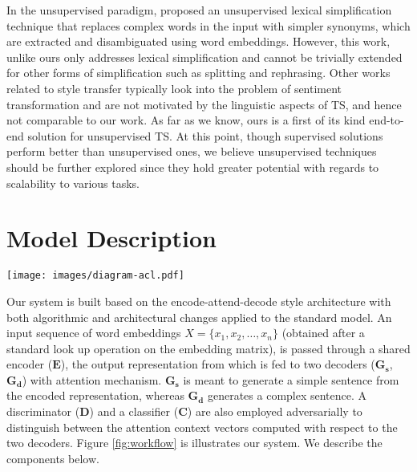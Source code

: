 \documentclass[11pt,a4paper]{article}
\begin{document}
In the unsupervised paradigm,  proposed an unsupervised lexical simplification technique that replaces complex words in the input with simpler synonyms, which are extracted and disambiguated using word embeddings. However, this work, unlike ours only addresses lexical simplification and cannot be trivially extended for other forms of simplification such as splitting and rephrasing. Other works related to style transfer \cite{zhang2018style,shen2017style,xu2018unpaired} typically look into the problem of sentiment transformation and are not motivated by the linguistic aspects of TS, and hence not comparable to our work. As far as we know, ours is a first of its kind end-to-end solution for unsupervised TS. At this point, though supervised solutions perform better than unsupervised ones, we believe unsupervised techniques should be further explored since they hold greater potential with regards to scalability to various tasks.


%
 \section{Model Description}
\label{sec:system}
\begin{figure*}[t]
\centering 
\texttt{[image: images/diagram-acl.pdf]}
\caption{System Architecture. Input sentences of any domain is encoded by $\boldsymbol{E}$, and decoded by $\boldsymbol{G_s}$, $\boldsymbol{G_d}$. Discriminator $\boldsymbol{D}$ and classifier $\boldsymbol{C}$ tune the attention vectors for simplification. $\mathcal{L}$ represents loss functions. The figure only reveals one layer in $\boldsymbol{E}$, $\boldsymbol{G_s}$ and $\boldsymbol{G_d}$ for simplicity. However, the model uses two layers of GRUs (Section \ref{sec:system}).}
\label{fig:workflow}
\end{figure*}
Our system is built based on the encode-attend-decode style architecture \cite{bahdanau2014neural} with both algorithmic and architectural changes applied to the standard model. An input sequence of word embeddings $X=\{x_1,x_2,\ldots,x_n\}$ (obtained after a standard look up operation on the embedding matrix), is passed through a shared encoder ($\boldsymbol{E}$), the output representation from which is fed to two decoders ($\boldsymbol{G_s}$, $\boldsymbol{G_d}$) with attention mechanism. $\boldsymbol{G_s}$ is meant to generate a simple sentence from the encoded representation, whereas $\boldsymbol{G_d}$ generates a complex sentence. A discriminator ($\boldsymbol{D}$) and a classifier ($\boldsymbol{C}$) are also employed adversarially to distinguish between the attention context vectors computed with respect to the two decoders. Figure \ref{fig:workflow} is illustrates our system. We describe the components below. 
\end{document}
